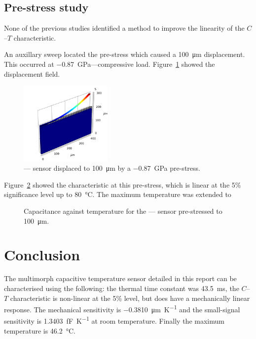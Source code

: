 \documentclass[a4paper,10pt,twocolumn]{article}
\begin{document}
\subsection{Pre-stress study}

None of the previous studies identified a method to improve the linearity of
the $C$--$T$ characteristic.

An auxillary sweep located the pre-stress which caused a \SI{100}{\micro\meter}
displacement. This occurred at \SI{-0.87}{\giga\pascal}---compressive load.
Figure~\ref{fig:pre-stress-disp} showed the displacement field.

\begin{figure}[h]
    \centering
    \includegraphics[width=0.4\textwidth]{img/pre_stress_disp.png}
    \caption{---- sensor displaced to
        \SI{100}{\micro\meter} by a \SI{-0.87}{\giga\pascal} pre-stress.}
    \label{fig:pre-stress-disp}
\end{figure}

Figure~\ref{fig:prestress.C-T} showed the characteristic at this pre-stress,
which is linear at the 5\% significance level up to \SI{80}{\celsius}. The
maximum temperature was extended to 

\begin{figure}[h]
    \centering
    \begin{footnotesize}
        
    \end{footnotesize}
    \caption{Capacitance against temperature for the ----
         sensor pre-stressed to \SI{100}{\micro\meter}.}
    \label{fig:prestress.C-T}
\end{figure}


\section{Conclusion}

The multimorph capacitive temperature sensor detailed in this report can be
characterised using the following: the thermal time constant was
\SI{43.5}{\milli\second}, the $C$--$T$ characteristic is non-linear at
the 5\% level, but does have a mechanically linear response. The mechanical
sensitivity is \SI{-0.3810}{\micro\meter\per\kelvin} and the small-signal
sensitivity is \SI{1.3403}{\femto\farad\per\kelvin} at room temperature. Finally
the maximum temperature is \SI{46.2}{\celsius}. 
\end{document}
